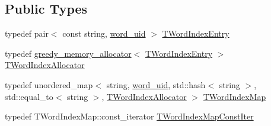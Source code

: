 \subsection*{Public Types}
\begin{DoxyCompactItemize}
\item 
typedef pair$<$ const string, \hyperlink{namespaceuva_1_1smt_1_1bpbd_1_1server_a6bfe45ba344d65a7fdd7d26156328ddc}{word\+\_\+uid} $>$ \hyperlink{classuva_1_1smt_1_1bpbd_1_1server_1_1lm_1_1dictionary_1_1basic__word__index_a61bd773bb1c79c5be7679fc557f27747}{T\+Word\+Index\+Entry}
\item 
typedef \hyperlink{classuva_1_1utils_1_1containers_1_1alloc_1_1greedy__memory__allocator}{greedy\+\_\+memory\+\_\+allocator}$<$ \hyperlink{classuva_1_1smt_1_1bpbd_1_1server_1_1lm_1_1dictionary_1_1basic__word__index_a61bd773bb1c79c5be7679fc557f27747}{T\+Word\+Index\+Entry} $>$ \hyperlink{classuva_1_1smt_1_1bpbd_1_1server_1_1lm_1_1dictionary_1_1basic__word__index_a7dcfe947b277f05987cf55dfbd1fd021}{T\+Word\+Index\+Allocator}
\item 
typedef unordered\+\_\+map$<$ string, \hyperlink{namespaceuva_1_1smt_1_1bpbd_1_1server_a6bfe45ba344d65a7fdd7d26156328ddc}{word\+\_\+uid}, std\+::hash$<$ string $>$, std\+::equal\+\_\+to$<$ string $>$, \hyperlink{classuva_1_1smt_1_1bpbd_1_1server_1_1lm_1_1dictionary_1_1basic__word__index_a7dcfe947b277f05987cf55dfbd1fd021}{T\+Word\+Index\+Allocator} $>$ \hyperlink{classuva_1_1smt_1_1bpbd_1_1server_1_1lm_1_1dictionary_1_1basic__word__index_ab58bffa80202cb71ba13ba19814b622c}{T\+Word\+Index\+Map}
\item 
typedef T\+Word\+Index\+Map\+::const\+\_\+iterator \hyperlink{classuva_1_1smt_1_1bpbd_1_1server_1_1lm_1_1dictionary_1_1basic__word__index_ac35f9263ddd75993ac68944b4521ec38}{T\+Word\+Index\+Map\+Const\+Iter}
\end{DoxyCompactItemize}
